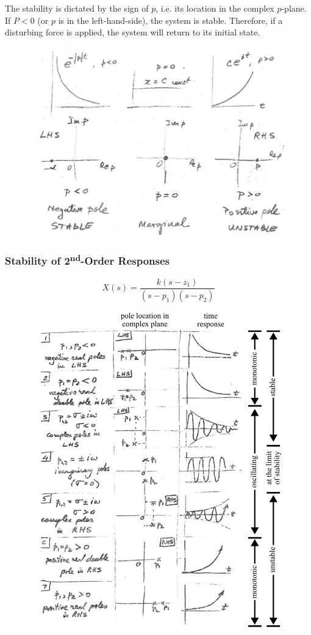 \documentclass[12pt,letter]{article}
\begin{document}
The stability is dictated by the sign of $p$, i.e. its location in the complex $p$-plane. If $P<0$ (or $p$ is in the left-hand-side), the system is stable. Therefore, if a disturbing force is applied, the system will return to its initial state.  


\begin{figure}[H]
	\centering
	\includegraphics[width=4.5in]{../figures/system_stability_first_order}
\end{figure}

\subsubsection{Stability of 2\textsuperscript{nd}-Order Responses}

\begin{equation}
X(s) = \frac{k(s-z_1)}{(s-p_1)(s-p_2)}
\end{equation}

\begin{figure}[H]
	\centering
	\includegraphics[width=4.5in]{../figures/2nd_order_poles}
\end{figure}
\end{document}
